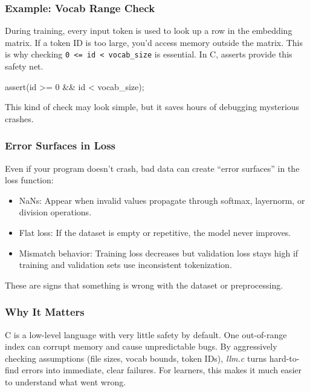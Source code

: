 \documentclass[
  letterpaper,
  DIV=11,
  numbers=noendperiod]{scrreprt}
\newenvironment{Shaded}{\begin{snugshade}}{\end{snugshade}}
\newcommand{\DecValTok}[1]{\textcolor[rgb]{0.68,0.00,0.00}{#1}}
\newcommand{\NormalTok}[1]{\textcolor[rgb]{0.00,0.23,0.31}{#1}}
\newcommand{\OperatorTok}[1]{\textcolor[rgb]{0.37,0.37,0.37}{#1}}
\providecommand{\tightlist}{%
  \setlength{\itemsep}{0pt}\setlength{\parskip}{0pt}}
\begin{document}
\subsubsection{Example: Vocab Range
Check}\label{example-vocab-range-check}

During training, every input token is used to look up a row in the
embedding matrix. If a token ID is too large, you'd access memory
outside the matrix. This is why checking
\texttt{0\ \textless{}=\ id\ \textless{}\ vocab\_size} is essential. In
C, asserts provide this safety net.

\begin{Shaded}
\begin{Highlighting}[]
\NormalTok{assert}\OperatorTok{(}\NormalTok{id }\OperatorTok{\textgreater{}=} \DecValTok{0} \OperatorTok{\&\&}\NormalTok{ id }\OperatorTok{\textless{}}\NormalTok{ vocab\_size}\OperatorTok{);}
\end{Highlighting}
\end{Shaded}

This kind of check may look simple, but it saves hours of debugging
mysterious crashes.

\subsubsection{Error Surfaces in Loss}\label{error-surfaces-in-loss}

Even if your program doesn't crash, bad data can create ``error
surfaces'' in the loss function:

\begin{itemize}
\tightlist
\item
  NaNs: Appear when invalid values propagate through softmax, layernorm,
  or division operations.
\item
  Flat loss: If the dataset is empty or repetitive, the model never
  improves.
\item
  Mismatch behavior: Training loss decreases but validation loss stays
  high if training and validation sets use inconsistent tokenization.
\end{itemize}

These are signs that something is wrong with the dataset or
preprocessing.

\subsubsection{Why It Matters}\label{why-it-matters-7}

C is a low-level language with very little safety by default. One
out-of-range index can corrupt memory and cause unpredictable bugs. By
aggressively checking assumptions (file sizes, vocab bounds, token IDs),
\emph{llm.c} turns hard-to-find errors into immediate, clear failures.
For learners, this makes it much easier to understand what went wrong.
\end{document}
